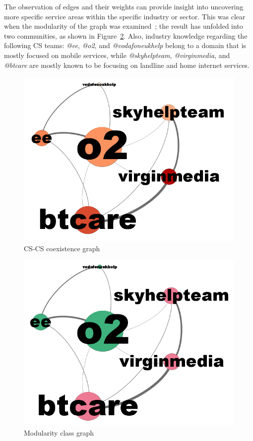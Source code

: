 \documentclass[sigconf]{acmart}
\begin{document}
{The observation of edges and their weights can provide insight into
uncovering more specific service areas within the specific industry or
sector. This was clear when the modularity of the graph was
examined~\cite{Blondel2008}; the result has unfolded into two
communities, as shown in Figure~\ref{fig:modularityclassgraph}. Also,
industry knowledge regarding the following CS teams: {\emph{@ee}},
{\emph{@o2}}, and {\emph{@vodafoneukhelp}} belong to a domain that is
mostly focused on mobile services, while {\emph{@skyhelpteam}},
{\emph{@virginmedia}}, and {\emph{@btcare}} are mostly known to be
focusing on landline and home internet services.

\begin{figure}[htb]
\centering
\includegraphics[width=\columnwidth]{images/coexistencegraph.png}
\caption{CS-CS coexistence graph}
\label{fig:coexistencegraph}
\end{figure}

\begin{figure}[htb]
\centering
\includegraphics[width=\columnwidth]{images/modularityclassgraph.png}
\caption{Modularity class graph}
\label{fig:modularityclassgraph}
\end{figure}

}
\end{document}
